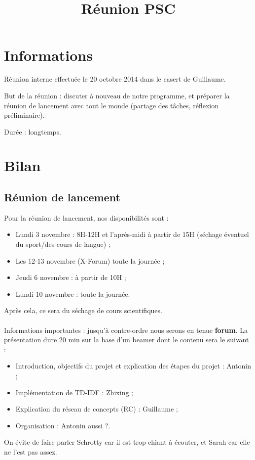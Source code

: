 \documentclass{article}
\title{Réunion PSC}
\author{}
\begin{document}
                 
\maketitle
    
\section{Informations}

Réunion interne effectuée le 20 octobre 2014 dans le casert de Guillaume.

But de la réunion : discuter à nouveau de notre programme, et préparer la réunion de lancement avec tout le monde (partage des tâches, réflexion préliminaire).

Durée : longtemps.

\section{Bilan}

\subsection{Réunion de lancement}

Pour la réunion de lancement, nos disponibilités sont :
\begin{itemize}
 \item Lundi 3 novembre : 8H-12H et l'après-midi à partir de 15H (séchage éventuel du sport/des cours de langue) ;
 \item Les 12-13 novembre (X-Forum) toute la journée ;
 \item Jeudi 6 novembre : à partir de 10H ;
 \item Lundi 10 novembre : toute la journée.
\end{itemize}
Après cela, ce sera du séchage de cours scientifiques.

\paragraph{}
Informations importantes : jusqu'à contre-ordre nous serons en tenue \textbf{forum}. La présentation dure 20 min sur la base d'un beamer dont le contenu sera le suivant :
\begin{itemize}
 \item Introduction, objectifs du projet et explication des étapes du projet : Antonin ;
 \item Implémentation de TD-IDF : Zhixing ;
 \item Explication du réseau de concepts (RC) : Guillaume ;
 \item Organisation : Antonin aussi ?.
\end{itemize}
On évite de faire parler Schrotty car il est trop chiant à écouter, et Sarah car elle ne l'est pas assez.
\end{document}
